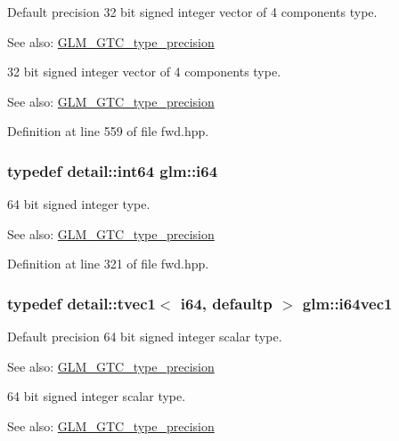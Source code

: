 Default precision 32 bit signed integer vector of 4 components type. \begin{Desc}
\item[See also:]\hyperlink{group__gtc__type__precision}{GLM\_\-GTC\_\-type\_\-precision}\end{Desc}
32 bit signed integer vector of 4 components type. \begin{Desc}
\item[See also:]\hyperlink{group__gtc__type__precision}{GLM\_\-GTC\_\-type\_\-precision} \end{Desc}


Definition at line 559 of file fwd.hpp.\hypertarget{group__gtc__type__precision_gc7a7eaad46064fc952b06df33689da23}{
\subsubsection[i64]{\setlength{\rightskip}{0pt plus 5cm}typedef detail::int64 {\bf glm::i64}}}
\label{group__gtc__type__precision_gc7a7eaad46064fc952b06df33689da23}


64 bit signed integer type. \begin{Desc}
\item[See also:]\hyperlink{group__gtc__type__precision}{GLM\_\-GTC\_\-type\_\-precision} \end{Desc}


Definition at line 321 of file fwd.hpp.\hypertarget{group__gtc__type__precision_g8bc234da7e4a6436e01241f439fc7ddd}{
\subsubsection[i64vec1]{\setlength{\rightskip}{0pt plus 5cm}typedef detail::tvec1$<$ i64, defaultp $>$ {\bf glm::i64vec1}}}
\label{group__gtc__type__precision_g8bc234da7e4a6436e01241f439fc7ddd}


Default precision 64 bit signed integer scalar type. \begin{Desc}
\item[See also:]\hyperlink{group__gtc__type__precision}{GLM\_\-GTC\_\-type\_\-precision}\end{Desc}
64 bit signed integer scalar type. \begin{Desc}
\item[See also:]\hyperlink{group__gtc__type__precision}{GLM\_\-GTC\_\-type\_\-precision} \end{Desc}


